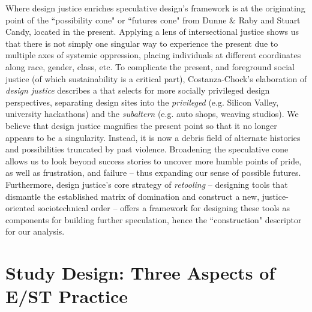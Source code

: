 \documentclass[manuscript,review,anonymous]{acmart}
\begin{document}
Where design justice enriches speculative design's framework is at the originating point of %
the ``possibility cone" or ``futures cone" from Dunne \& Raby and Stuart Candy, located in the present. Applying a lens of intersectional justice shows us that there is not simply one singular way to experience the present due to multiple axes of systemic oppression, placing individuals at different coordinates along race, gender, class, etc. To complicate the present, and foreground social justice (of which sustainability is a critical part), Costanza-Chock's elaboration of \textit{design justice} \cite{costanza-chock_design_2020} describes a  that selects for more socially privileged design perspectives, separating design sites into the \textit{privileged} (e.g. Silicon Valley, university hackathons) and the \textit{subaltern} (e.g. auto shops, weaving studios). We believe that design justice magnifies the present point so that it no longer appears to be a singularity. Instead, it is now a debris field of alternate histories and possibilities truncated by past violence.
Broadening the speculative cone allows us to look beyond success stories to uncover more humble points of pride, as well as frustration, and failure -- thus expanding our sense of possible futures. Furthermore, design justice's core strategy of \textit{retooling} -- designing tools that dismantle the established matrix of domination and construct a new, justice-oriented sociotechnical order -- offers a framework for designing these tools as components for building further speculation, hence the ``construction" descriptor for our analysis.








\section{Study Design: Three Aspects of E/ST Practice}
\end{document}
